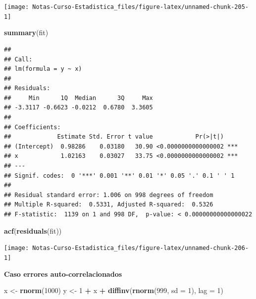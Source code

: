 \documentclass[
  12pt,
]{book}
\newenvironment{Shaded}{\begin{snugshade}}{\end{snugshade}}
\newcommand{\DataTypeTok}[1]{\textcolor[rgb]{0.13,0.29,0.53}{#1}}
\newcommand{\DecValTok}[1]{\textcolor[rgb]{0.00,0.00,0.81}{#1}}
\newcommand{\KeywordTok}[1]{\textcolor[rgb]{0.13,0.29,0.53}{\textbf{#1}}}
\newcommand{\NormalTok}[1]{#1}
\newcommand{\OperatorTok}[1]{\textcolor[rgb]{0.81,0.36,0.00}{\textbf{#1}}}
\newcommand{\StringTok}[1]{\textcolor[rgb]{0.31,0.60,0.02}{#1}}
\theoremstyle{definition}
\theoremstyle{definition}
\theoremstyle{definition}
\theoremstyle{remark}
\begin{document}
\begin{center}\texttt{[image: Notas-Curso-Estadistica\_files/figure-latex/unnamed-chunk-205-1]} \end{center}

\begin{Shaded}
\begin{Highlighting}[]
\KeywordTok{summary}\NormalTok{(fit)}
\end{Highlighting}
\end{Shaded}

\begin{verbatim}
## 
## Call:
## lm(formula = y ~ x)
## 
## Residuals:
##     Min      1Q  Median      3Q     Max 
## -3.3117 -0.6623 -0.0212  0.6780  3.3605 
## 
## Coefficients:
##             Estimate Std. Error t value            Pr(>|t|)    
## (Intercept)  0.98286    0.03180   30.90 <0.0000000000000002 ***
## x            1.02163    0.03027   33.75 <0.0000000000000002 ***
## ---
## Signif. codes:  0 '***' 0.001 '**' 0.01 '*' 0.05 '.' 0.1 ' ' 1
## 
## Residual standard error: 1.006 on 998 degrees of freedom
## Multiple R-squared:  0.5331, Adjusted R-squared:  0.5326 
## F-statistic:  1139 on 1 and 998 DF,  p-value: < 0.00000000000000022
\end{verbatim}

\begin{Shaded}
\begin{Highlighting}[]
\KeywordTok{acf}\NormalTok{(}\KeywordTok{residuals}\NormalTok{(fit))}
\end{Highlighting}
\end{Shaded}

\begin{center}\texttt{[image: Notas-Curso-Estadistica\_files/figure-latex/unnamed-chunk-206-1]} \end{center}

\textbf{Caso errores auto-correlacionados}

\begin{Shaded}
\begin{Highlighting}[]
\NormalTok{x <-}\StringTok{ }\KeywordTok{rnorm}\NormalTok{(}\DecValTok{1000}\NormalTok{)}
\NormalTok{y <-}\StringTok{ }\DecValTok{1} \OperatorTok{+}\StringTok{ }\NormalTok{x }\OperatorTok{+}\StringTok{ }\KeywordTok{diffinv}\NormalTok{(}\KeywordTok{rnorm}\NormalTok{(}\DecValTok{999}\NormalTok{, }\DataTypeTok{sd =} \DecValTok{1}\NormalTok{), }\DataTypeTok{lag =} \DecValTok{1}\NormalTok{)}
\end{Highlighting}
\end{Shaded}
\end{document}
